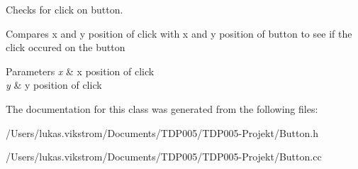 Checks for click on button. 

Compares x and y position of click with x and y position of button to see if the click occured on the button


\begin{DoxyParams}{Parameters}
{\em x} & x position of click \\
\hline
{\em y} & y position of click \\
\hline
\end{DoxyParams}


The documentation for this class was generated from the following files\+:\begin{DoxyCompactItemize}
\item 
/\+Users/lukas.\+vikstrom/\+Documents/\+T\+D\+P005/\+T\+D\+P005-\/\+Projekt/Button.\+h\item 
/\+Users/lukas.\+vikstrom/\+Documents/\+T\+D\+P005/\+T\+D\+P005-\/\+Projekt/Button.\+cc\end{DoxyCompactItemize}
